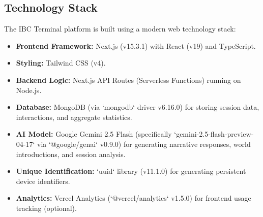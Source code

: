 \documentclass{article}
\begin{document}
\subsection{Technology Stack}
The IBC Terminal platform is built using a modern web technology stack:
\begin{itemize}
    \item \textbf{Frontend Framework:} Next.js (v15.3.1) with React (v19) and TypeScript.
    \item \textbf{Styling:} Tailwind CSS (v4).
    \item \textbf{Backend Logic:} Next.js API Routes (Serverless Functions) running on Node.js.
    \item \textbf{Database:} MongoDB (via `mongodb` driver v6.16.0) for storing session data, interactions, and aggregate statistics.
    \item \textbf{AI Model:} Google Gemini 2.5 Flash (specifically `gemini-2.5-flash-preview-04-17` via `@google/genai` v0.9.0) for generating narrative responses, world introductions, and session analysis.
    \item \textbf{Unique Identification:} `uuid` library (v11.1.0) for generating persistent device identifiers.
    \item \textbf{Analytics:} Vercel Analytics (`@vercel/analytics` v1.5.0) for frontend usage tracking (optional).
\end{itemize}
\end{document}
